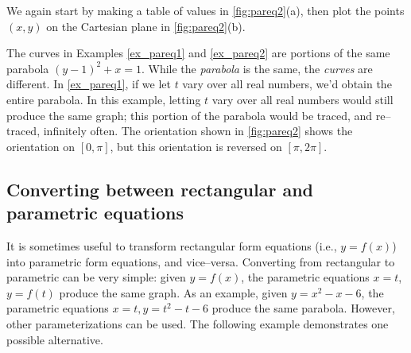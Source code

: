 {We again start by making a table of values in \autoref{fig:pareq2}(a), then plot the points $(x,y)$ on the Cartesian plane in \autoref{fig:pareq2}(b).

The curves in Examples \ref{ex_pareq1} and \ref{ex_pareq2} are portions of the same parabola $(y-1)^2+x=1$. While the \textit{parabola} is the same, the \textit{curves} are different. In \autoref{ex_pareq1}, if we let $t$ vary over all real numbers, we'd obtain the entire parabola. In this example, letting $t$ vary over all real numbers would still produce the same graph; this portion of the parabola would be traced, and re--traced, infinitely often. The orientation shown in \autoref{fig:pareq2} shows the orientation on $[0,\pi]$, but this orientation is reversed on $[\pi,2\pi]$.}

\subsection*{Converting between rectangular and parametric equations}

It is sometimes useful to transform rectangular form equations (i.e., $y=f(x)$) into parametric form equations, and vice--versa. Converting from rectangular to parametric can be very simple: given $y=f(x)$, the parametric equations $x=t$, $y=f(t)$ produce the same graph. As an example, given $y=x^2-x-6$, the parametric equations $x=t, y=t^2-t-6$ produce the same parabola. However, other parameterizations can be used. The following example demonstrates one possible alternative.

